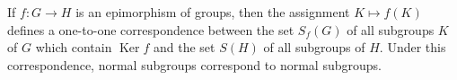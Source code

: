 If $f \colon G \to H$ is an epimorphism of groups, then the assignment $K \mapsto f(K)$ defines a one-to-one correspondence between the set $S_f(G)$ of all subgroups $K$ of $G$ which contain $\operatorname{Ker} f$ and the set $S(H)$ of all subgroups of $H$. Under this correspondence, normal subgroups correspond to normal subgroups.
